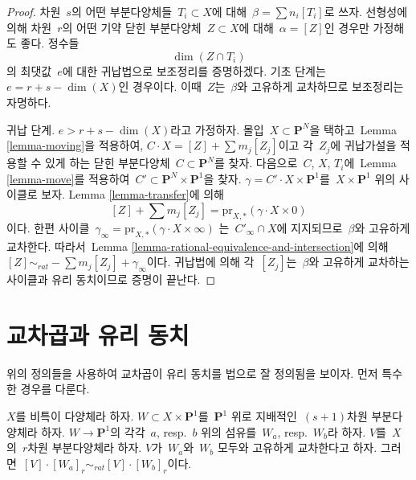 \begin{proof}
차원\  $s$의 어떤 부분다양체들\  $T_i \subset X$에 대해\ 
$\beta = \sum n_i[T_i]$로 쓰자. 선형성에 의해 차원\  $r$의 어떤 기약
닫힌 부분다양체\  $Z \subset X$에 대해\  $\alpha = [Z]$인 경우만
가정해도 좋다. 정수들
$$
\dim(Z \cap T_i)
$$
의 최댓값\  $e$에 대한 귀납법으로 보조정리를 증명하겠다.
기초 단계는\  $e = r + s - \dim(X)$인 경우이다. 이때\  $Z$는\ 
$\beta$와 고유하게 교차하므로 보조정리는 자명하다.

\medskip\noindent
귀납 단계. $e > r + s - \dim(X)$라고 가정하자. 몰입\ 
$X \subset \mathbf{P}^N$을 택하고\  Lemma \ref{lemma-moving}을
적용하여, $C \cdot X = [Z] + \sum m_j[Z_j]$이고 각\  $Z_j$에 귀납가설을
적용할 수 있게 하는 닫힌 부분다양체\  $C \subset \mathbf{P}^N$를 찾자.
다음으로\  $C$, $X$, $T_i$에\  Lemma \ref{lemma-move}를 적용하여\ 
$C' \subset \mathbf{P}^N \times \mathbf{P}^1$을 찾자.
$\gamma = C' \cdot X \times \mathbf{P}^1$를\ 
$X \times \mathbf{P}^1$ 위의 사이클로 보자. Lemma
\ref{lemma-transfer}에 의해
$$
[Z] + \sum m_j[Z_j] = \text{pr}_{X, *}(\gamma \cdot X \times 0)
$$
이다. 한편 사이클\ 
$\gamma_\infty = \text{pr}_{X, *}(\gamma \cdot X \times \infty)$
는\  $C'_\infty \cap X$에 지지되므로\  $\beta$와 고유하게 교차한다.
따라서\  Lemma \ref{lemma-rational-equivalence-and-intersection}에 의해\ 
$[Z] \sim_{rat} - \sum m_j[Z_j] + \gamma_\infty$이다. 귀납법에 의해
각\  $[Z_j]$는\  $\beta$와 고유하게 교차하는 사이클과 유리 동치이므로
증명이 끝난다.
\end{proof}



\section{교차곱과 유리 동치}
\label{section-intersections-and-rational-equivalence}

\noindent
위의 정의들을 사용하여 교차곱이 유리 동치를 법으로 잘 정의됨을 보이자.
먼저 특수한 경우를 다룬다.

\begin{lemma}
\label{lemma-well-defined-special-case}
$X$를 비특이 다양체라 하자.
$W \subset X \times \mathbf{P}^1$를\  $\mathbf{P}^1$ 위로 지배적인\ 
$(s + 1)$차원 부분다양체라 하자. $W \to \mathbf{P}^1$의
각각\  $a$, resp.\ $b$ 위의 섬유를\  $W_a$, resp.\ $W_b$라 하자.
$V$를\  $X$의\  $r$차원 부분다양체라 하자. $V$가\  $W_a$와\  $W_b$ 모두와
고유하게 교차한다고 하자. 그러면\ 
$[V] \cdot [W_a]_r \sim_{rat} [V] \cdot [W_b]_r$이다.
\end{lemma}

